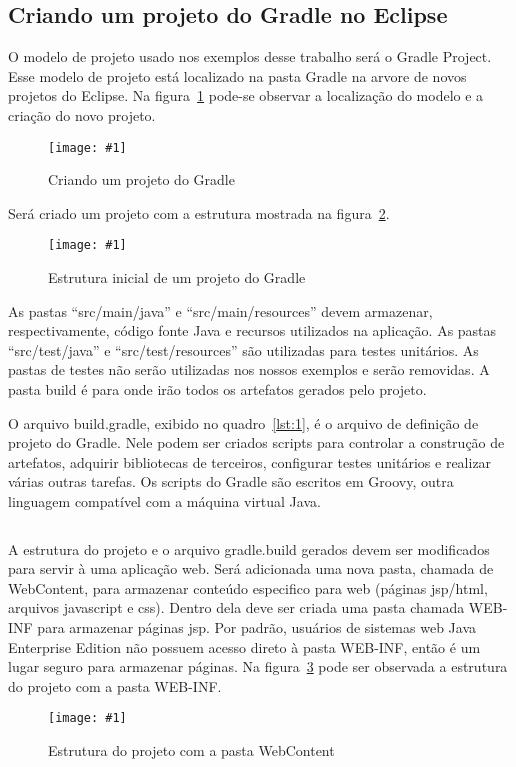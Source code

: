 \documentclass[a4paper,12pt]{article}
\newenvironment{simple}%
{\noindent}%
{\par\noindent}
\newcommand{\figura}[3] {
	\begin{figure}[H]
		\centering
		\texttt{[image: \#1]}
		\caption{#2}
		\label{#3}
	\end{figure}
	\FloatBarrier
}
\newcommand{\groovycode}[3] {
	\begin{simple}
	\inputminted[fontsize=\footnotesize]{groovy}{#1}
	\captionof{listing}{#2}
	\label{#3}
	\end{simple}
	\FloatBarrier
}
\begin{document}
\subsection{Criando um projeto do Gradle no Eclipse}

O modelo de projeto usado nos exemplos desse trabalho será o Gradle Project. Esse modelo de projeto está localizado na pasta Gradle na arvore de novos projetos do Eclipse. Na figura~\ref{fig:gradleproject} pode-se observar a localização do modelo e a criação do novo projeto.

\figura{gradleproject1.png}{Criando um projeto do Gradle}{fig:gradleproject}

Será criado um projeto com a estrutura mostrada na figura~\ref{fig:gradletree}.

\figura{gradleproject1.png}{Estrutura inicial de um projeto do Gradle}{fig:gradletree}

As pastas “src/main/java” e “src/main/resources” devem armazenar, respectivamente, código fonte Java e recursos utilizados na aplicação.  As pastas “src/test/java” e “src/test/resources” são utilizadas para testes unitários. As pastas de testes não serão utilizadas nos nossos exemplos e serão removidas. A pasta build é para onde irão todos os artefatos gerados pelo projeto.

O arquivo build.gradle, exibido no quadro~\ref{lst:1}, é o arquivo de definição de projeto do Gradle. Nele podem ser criados scripts para controlar a construção de artefatos, adquirir bibliotecas de terceiros, configurar testes unitários e realizar várias outras tarefas. Os scripts do Gradle são escritos em Groovy, outra linguagem compatível com a máquina virtual Java. 

\groovycode{code/buildgradle.txt}{O arquivo build.gradle}{lst:1}

A estrutura do projeto e o arquivo gradle.build gerados devem ser modificados para servir à uma aplicação web. Será adicionada uma nova pasta, chamada de WebContent, para armazenar conteúdo especifico para web (páginas jsp/html, arquivos javascript e css). Dentro dela deve ser criada uma pasta chamada WEB-INF para armazenar páginas jsp. Por padrão, usuários de sistemas web Java Enterprise Edition não possuem acesso direto à pasta WEB-INF, então é um lugar seguro para armazenar páginas. Na figura~\ref{fig:12} pode ser observada a estrutura do projeto com a pasta WEB-INF.

\figura{prrojetocomweninf.png}{Estrutura do projeto com a pasta WebContent}{fig:12}
\end{document}
